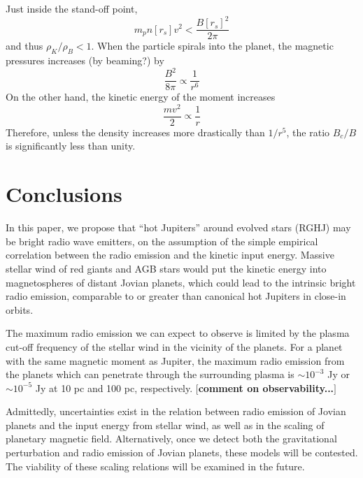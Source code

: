 \documentclass{emulateapj}
\def\memoYF#1{\color{red}$[${\bf #1}$]$ \color{black}}
\begin{document}
Just inside the stand-off point, 
\begin{equation}
m_p n[r_s] v^2 < \frac{B[r_s]^2}{2\pi }
\end{equation}
and thus $\rho_K/\rho _B < 1$. 
When the particle spirals into the planet, 
the magnetic pressures increases (by beaming?) by 
\begin{equation}
\frac{B^2}{8\pi } \propto \frac{1}{r^6}
\end{equation}
On the other hand, the kinetic energy of the moment increases
\begin{equation}
\frac{mv^2}{2} \propto \frac{1}{r}
\end{equation}
Therefore, unless the density increases more drastically than $1/r^5$, the ratio $B_c/B$ is significantly less than unity. 



\section{Conclusions}
\label{sec:conc}

In this paper, we propose that ``hot Jupiters'' around evolved stars (RGHJ) may be bright radio wave emitters, on the assumption of the simple empirical correlation between the radio emission and the kinetic input energy. 
Massive stellar wind of red giants and AGB stars would put the kinetic energy into magnetospheres of distant Jovian planets, which could lead to the intrinsic bright radio emission, comparable to or greater than canonical hot Jupiters in close-in orbits. 

The maximum radio emission we can expect to observe is limited by the plasma cut-off frequency of the stellar wind in the vicinity of the planets. 
For a planet with the same magnetic moment as Jupiter, the maximum radio emission from the planets which can penetrate through the surrounding plasma is $\sim 10^{-3}$ Jy or $\sim 10^{-5}$ Jy at 10 pc and 100 pc, respectively. 
\memoYF{comment on observability...}

Admittedly, uncertainties exist in the relation between radio emission of Jovian planets and the input energy from stellar wind, as well as in the scaling of planetary magnetic field. 
Alternatively, once we detect both the gravitational perturbation and radio emission of Jovian planets, these models will be contested. The viability of these scaling relations will be examined in the future. 
\end{document}
